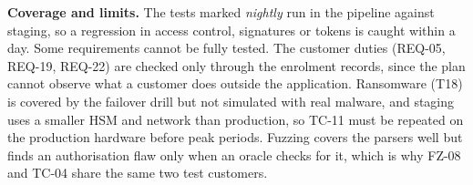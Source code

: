 \textbf{Coverage and limits.} The tests marked \emph{nightly} run in the
pipeline against staging, so a regression in access control, signatures
or tokens is caught within a day. Some requirements cannot be fully
tested. The customer duties (\mbox{REQ-05}, \mbox{REQ-19},
\mbox{REQ-22}) are checked only through the enrolment records, since the
plan cannot observe what a customer does outside the application.
Ransomware (T18) is covered by the failover drill but not simulated with
real malware, and staging uses a smaller \ac{HSM} and network than
production, so TC-11 must be repeated on the production hardware before
peak periods. Fuzzing covers the parsers well but finds an authorisation
flaw only when an oracle checks for it, which is why FZ-08 and TC-04 share
the same two test customers.
